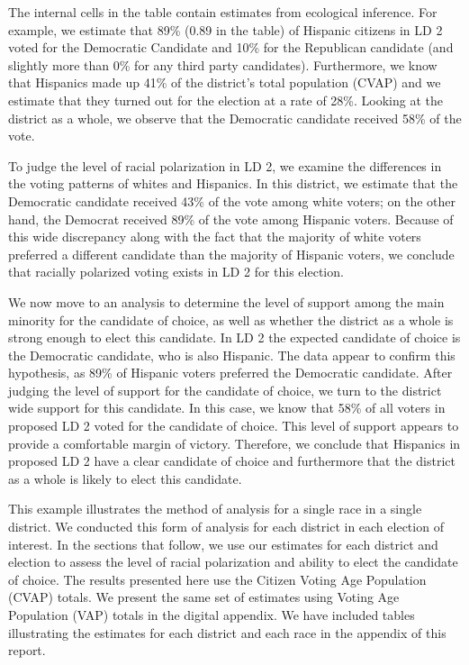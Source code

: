 \documentclass[12pt]{article}
\begin{document}
The internal cells in the table contain estimates from ecological
inference. For example, we estimate that 89\% (0.89 in the table) of
Hispanic citizens in LD 2 voted for the Democratic Candidate and 10\%
for the Republican candidate (and slightly more than 0\% for any third party candidates).
Furthermore, we know that Hispanics made up 41\% of the district's
total population (CVAP) and we estimate that they turned out for the
election at a rate of 28\%.  Looking at the district as a whole, we
observe that the Democratic candidate received 58\% of the vote.

To judge the level of racial polarization in LD 2, we examine the
differences in the voting patterns of whites and Hispanics. In this
district, we estimate that the Democratic candidate received 43\% of
the vote among white voters; on the other hand, the Democrat received
89\% of the vote among Hispanic voters. Because of this wide
discrepancy along with the fact that the majority of white voters
preferred a different candidate than the majority of Hispanic voters,
we conclude that racially polarized voting exists in LD 2 for this
election.

We now move to an analysis to determine the level of support among the
main minority for the candidate of choice, as well as whether the
district as a whole is strong enough to elect this candidate. In LD 2
the expected candidate of choice is the Democratic candidate, who is
also Hispanic. The data appear to confirm this hypothesis, as 89\% of
Hispanic voters preferred the Democratic candidate. After judging the
level of support for the candidate of choice, we turn to the district
wide support for this candidate. In this case, we know that 58\% of
all voters in proposed LD 2 voted for the candidate of choice. This
level of support appears to provide a comfortable margin of victory.
Therefore, we conclude that Hispanics in proposed LD 2 have a clear
candidate of choice and furthermore that the district as a whole is
likely to elect this candidate.

This example illustrates the method of analysis for a single race in a
single district. We conducted this form of analysis for each district
in each election of interest. In the sections that follow, we use our
estimates for each district and election to assess the level of racial
polarization and ability to elect the candidate of choice.  The
results presented here use the Citizen Voting Age Population (CVAP)
totals. We present the same set of estimates using Voting Age
Population (VAP) totals in the digital appendix.  We have included
tables illustrating the estimates for each district and each race in
the appendix of this report.
\end{document}
